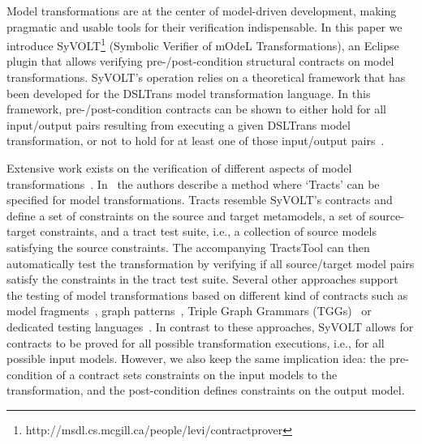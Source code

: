 Model transformations are at the center of model-driven development, making
pragmatic and usable tools for their verification indispensable. In this paper
we introduce
SyVOLT\footnote{http://msdl.cs.mcgill.ca/people/levi/contractprover} (Symbolic Verifier of mOdeL Transformations), an Eclipse plugin that allows verifying pre-/post-condition structural contracts on model transformations. SyVOLT's operation relies on a theoretical framework that has been developed for the DSLTrans model transformation language. In this framework, pre-/post-condition contracts can be shown to either hold for all input/output pairs resulting from
executing a given DSLTrans model transformation, or not to hold for at least
one of those input/output pairs~\cite{Lucio2014}.


Extensive work exists on the verification of different aspects of model
transformations~\cite{AmraniLSCDVTC12}. In~\cite{Vallecillo2012} the
authors describe a method where `Tracts' can be specified for model
transformations. Tracts resemble SyVOLT's contracts and define a set
of constraints on the source and target metamodels, a set of source-target constraints, and a tract test suite, i.e., a collection of source models
satisfying the source constraints. The accompanying TractsTool can then
automatically test the transformation by verifying if all source/target model
pairs satisfy the constraints in the tract test suite.
Several other approaches support the testing of model transformations based
on different kind of contracts such as model fragments~\cite{Mottu2008}, graph patterns~\cite{Guerra12,BaloghBCGHMPPRVa10},
Triple Graph Grammars (TGGs)~\cite{WieberAS14} or dedicated testing
languages~\cite{Garcia-Dominguez11}. In contrast to these approaches, SyVOLT
allows for contracts to be proved for all possible transformation executions, i.e., for all possible
input models. However, we also keep the same implication idea: the pre-condition of
a contract sets constraints on the input models to the transformation, and the post-condition defines constraints on the output model.

